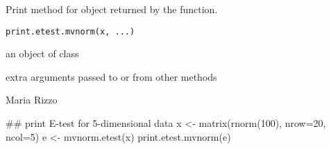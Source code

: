 \begin{Description}\relax
Print method for  object returned by the 
 function.
\end{Description}
\begin{Usage}
\begin{verbatim}
print.etest.mvnorm(x, ...)
\end{verbatim}
\end{Usage}
\begin{Arguments}
\begin{ldescription}
\item[\code{x}] an object of class  
\item[\code{...}] extra arguments passed to or from other methods 
\end{ldescription}
\end{Arguments}
\begin{Author}\relax
Maria Rizzo 
\end{Author}
\begin{SeeAlso}\relax
{}
\end{SeeAlso}
\begin{Examples}
\begin{ExampleCode}
 ## print E-test for 5-dimensional data
 x <- matrix(rnorm(100), nrow=20, ncol=5)
 e <- mvnorm.etest(x)
 print.etest.mvnorm(e)
 \end{ExampleCode}
\end{Examples}

